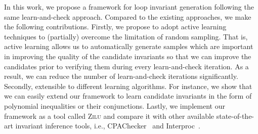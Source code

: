 In this work, we propose a framework for loop invariant generation following the same learn-and-check approach. %
Compared to the existing approaches, we make the following contributions. Firstly, we propose to adopt active learning techniques to (partially) overcome the limitation of random sampling. That is, active learning allows us to automatically generate samples which are important in improving the quality of the candidate invariants so that we can improve the candidates prior to verifying them during every learn-and-check iteration. As a result, we can reduce the number of learn-and-check iterations significantly.
Secondly,  extensible to different learning algorithms. For instance, we show that we can easily extend our framework to learn candidate invariants in the form of polynomial inequalities or their conjunctions.
Lastly, we implement our framework as a tool called \textsc{Zilu}
    and compare it with other available state-of-the-art invariant inference tools,
    i.e., CPAChecker~\cite{beyer2011cpachecker} and Interproc~\cite{jeannet2010interproc}.
